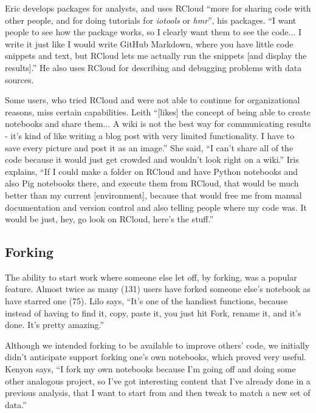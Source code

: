 Eric develops packages for analysts, and uses RCloud ``more for sharing code with
other people, and for doing tutorials for {\em iotools} or {\em hmr}'', his packages.
``I want people to see how the package works, so I clearly want them
to see the code... I write it just like I would write GitHub
Markdown, where you have little code snippets and text, but RCloud lets me
actually run the snippets [and display the results].'' He also uses RCloud for
describing and debugging problems with data sources.

Some users, who tried RCloud and were not able to continue for organizational
reasons, miss certain capabilities. Leith ``[likes] the concept of being
able to create notebooks and share them... A wiki is not the best way for
communicating results - it's kind of like writing a blog post with very limited
functionality. I have to save every picture and post it as an image.'' She said,
``I can't share all of the code because it would just get crowded and wouldn't
look right on a wiki.'' Iris explains, ``If I could make a folder on RCloud and
have Python notebooks and also Pig notebooks there, and execute them from RCloud,
that would be much better than my current [environment], because that would free
me from manual documentation and version control and also telling people where
my code was. It would be just, hey, go look on RCloud, here's the stuff.''



\subsection{Forking}
The ability to start work where someone else let off, by forking, was
a popular feature. Almost twice as many (131) users have forked
someone else's notebook as have starred one (75).  Lilo says, ``It's one of the
handiest functions, because instead of having to find it, copy, paste it, you
just hit Fork, rename it, and it's done. It's pretty amazing.''

Although we intended forking to be available to improve others' code, we 
initially didn't anticipate support forking one's own notebooks, which
proved very useful. Kenyon says, ``I fork my own notebooks because I'm going off
and doing some other analogous project, so I've got interesting content that I've
already done in a previous analysis, that I want to start from and then tweak
to match a new set of data.''

